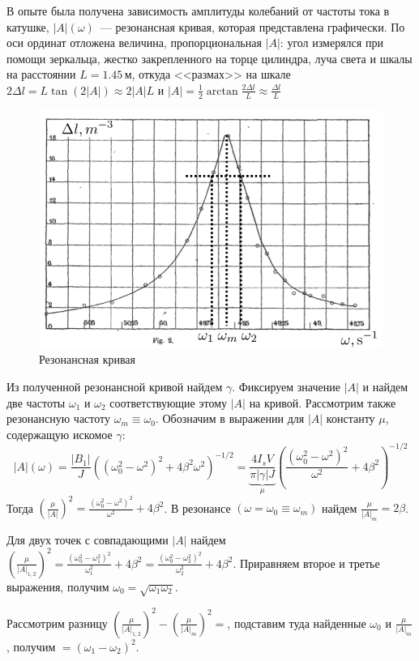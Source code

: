 \documentclass[a4paper]{article}
\begin{document}
В опыте была получена зависимость амплитуды колебаний от частоты тока в катушке, $|A|(\omega)$~--- резонансная кривая, которая представлена графически. По оси ординат отложена величина, пропорциональная $|A|$: угол измерялся при помощи зеркальца, жестко закрепленного на торце цилиндра, луча света и шкалы на расстоянии $L=1.45\, \mbox{м}$, откуда <<размах>> на шкале $2\Delta l=L\tan(2|A|)\approx2|A| L$ и $|A|=\frac{1}{2}\arctan\frac{2\Delta l}{L}\approx\frac{\Delta l}{L}$
\begin{figure}[H]
	\centering
	\includegraphics[width=15cm]{res}
	\caption{Резонансная кривая}
\end{figure}
Из полученной резонансной кривой найдем $\gamma$. Фиксируем значение $|A|$ и найдем две частоты $\omega_1$ и $\omega_2$ соответствующие этому $|A|$ на кривой. Рассмотрим также резонансную частоту $\omega_m\equiv\omega_0$. Обозначим в выражении для $|A|$ константу $\mu$, содержащую искомое $\gamma$:
$$
|A|(\omega)=\frac{|B_1|}{J}\left((\omega_0^2-\omega^2)^2+4\beta^2\omega^2\right)^{-1/2}=\underbrace{\frac{4I_sV}{\pi|\gamma|J}}_{\mu}\left(\frac{(\omega_0^2-\omega^2)^2}{\omega^2}+4\beta^2\right)^{-1/2}
$$
Тогда $(\frac{\mu}{|A|})^2=\frac{(\omega_0^2-\omega^2)^2}{\omega^2}+4\beta^2$. В резонансе $(\omega=\omega_0\equiv\omega_m)$ найдем $\frac{\mu}{|A|_m}=2\beta$.

Для двух точек с совпадающими $|A|$ найдем $(\frac{\mu}{|A|_{1,2}})^2=\frac{(\omega_0^2-\omega_1^2)^2}{\omega_1^2}+4\beta^2=\frac{(\omega_0^2-\omega_2^2)^2}{\omega_2^2}+4\beta^2$. Приравняем второе и третье выражения, получим $\omega_0=\sqrt{\omega_1\omega_2}$.

Рассмотрим разницу $(\frac{\mu}{|A|_{1,2}})^2-(\frac{\mu}{|A|_m})^2\boxed{=}$, подставим туда найденные $\omega_0$ и $\frac{\mu}{|A|_m}$, получим $\boxed{=}(\omega_1-\omega_2)^2$.
\end{document}
